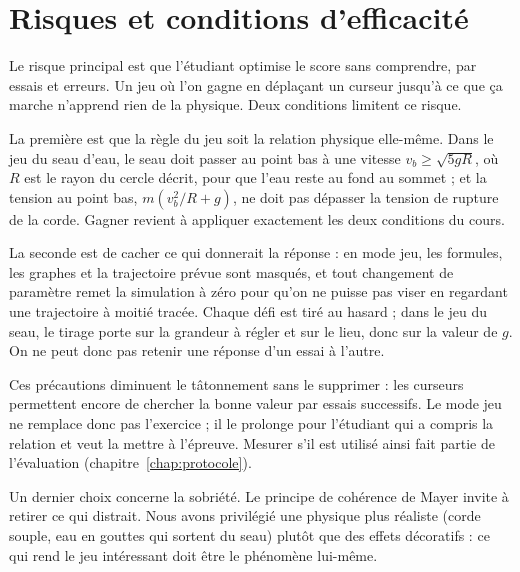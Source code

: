 \section{Risques et conditions d'efficacité}

Le risque principal est que l'étudiant optimise le score sans comprendre, par
essais et erreurs. Un jeu où l'on gagne en déplaçant un curseur jusqu'à ce
que ça marche n'apprend rien de la physique. Deux conditions limitent ce
risque.

La première est que la règle du jeu soit la relation physique elle-même.
Dans le jeu du seau d'eau, le seau doit passer au point bas à une vitesse
\(v_b \geq \sqrt{5 g R}\), où \(R\) est le rayon du cercle décrit, pour que
l'eau reste au fond au sommet ; et la tension au point bas,
\(m (v_b^2/R + g)\), ne doit pas dépasser la tension de rupture de la corde.
Gagner revient à appliquer exactement les deux conditions du cours.

La seconde est de cacher ce qui donnerait la réponse : en mode jeu, les
formules, les graphes et la trajectoire prévue sont masqués, et tout
changement de paramètre remet la simulation à zéro pour qu'on ne puisse pas
viser en regardant une trajectoire à moitié tracée. Chaque défi est tiré au
hasard ; dans le jeu du seau, le tirage porte sur la grandeur à régler et sur
le lieu, donc sur la valeur de \(g\). On ne peut donc pas retenir une réponse
d'un essai à l'autre.

Ces précautions diminuent le tâtonnement sans le supprimer : les curseurs
permettent encore de chercher la bonne valeur par essais successifs. Le mode
jeu ne remplace donc pas l'exercice ; il le prolonge pour l'étudiant qui a
compris la relation et veut la mettre à l'épreuve. Mesurer s'il est utilisé
ainsi fait partie de l'évaluation (chapitre~\ref{chap:protocole}).

Un dernier choix concerne la sobriété. Le principe de cohérence de Mayer
\cite{mayer2009} invite à retirer ce qui distrait. Nous avons privilégié une
physique plus réaliste (corde souple, eau en gouttes qui sortent du seau)
plutôt que des effets décoratifs : ce qui rend le jeu intéressant doit être
le phénomène lui-même.

